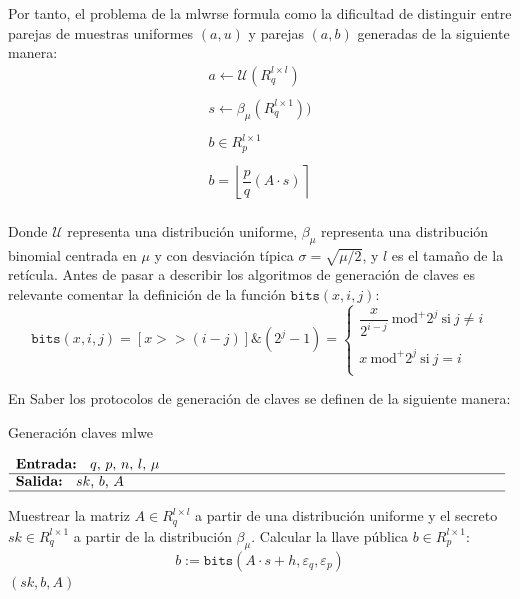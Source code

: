 Por tanto, el problema de la \gls{mlwr}se formula como la dificultad de distinguir entre parejas de muestras uniformes \((a,u)\) y parejas \((a,b)\) generadas de la siguiente manera:
\begin{equation}
	\begin{array}{l}
		a \leftarrow \mathcal{U}(R_q^{l\times l}) \\ \\
		s \leftarrow \beta_\mu (R_q^{l\times 1})) \\ \\
		b \in R_p^{l\times 1}\\ \\
		b=\left\lfloor \dfrac{p}{q} (A\cdot s)\right\rceil \\ 
	\end{array}
\end{equation}

Donde $\mathcal{U}$ representa una distribución uniforme,  $\beta_\mu$ representa una distribución binomial centrada en $\mu$ y con desviación típica $\sigma=\sqrt{\mu/2}$, y \(l\) es el tamaño de la retícula. Antes de pasar a describir los algoritmos de generación de claves es relevante comentar la definición de la función $\mathtt{bits}(x,i,j)$:
\begin{equation}
	\mathtt{bits}(x,i,j)=[x>>(i-j)]\& (2^j-1) =\left\{\begin{array}{l}
		\dfrac{x}{2^{i-j}}  \ \text{mod}^{+}\text{$2^j$} \ \text{si} \ j\ne i \\ \\
		x  \ \text{mod}^{+}\text{$2^j$} \ \text{si} \ j= i \\ 	
	\end{array}\right.
\end{equation}

En Saber los protocolos de generación de claves se definen de la siguiente manera:
\begin{algorithm}[H]
	\caption{Generación claves \gls{mlwe}} 
	$\begin{array}{p{\textwidth}}
		\textbf{Entrada: } \(q\), \(p\), \(n\), \(l\), \(\mu\)\\ 
		\hline
		\textbf{Salida: } \(sk\), \(b\), \(A\) \\ 
		\hline
	\end{array}$
	\begin{algorithmic}[1]
		\State Muestrear la matriz \(A\in R_q^{l\times l}\) a partir de una distribución uniforme y el secreto \(sk\in R_q^{l\times 1}\) a partir de la distribución \(\beta_\mu\).
		\State Calcular la llave pública \(b\in R_p^{l\times 1}\):
		\begin{equation}
			b:=\texttt{bits}(A\cdot s + h,\varepsilon_q, \varepsilon_p)
		\end{equation}
		\State \Return \((sk, b, A)\)
	\end{algorithmic}
\end{algorithm}

